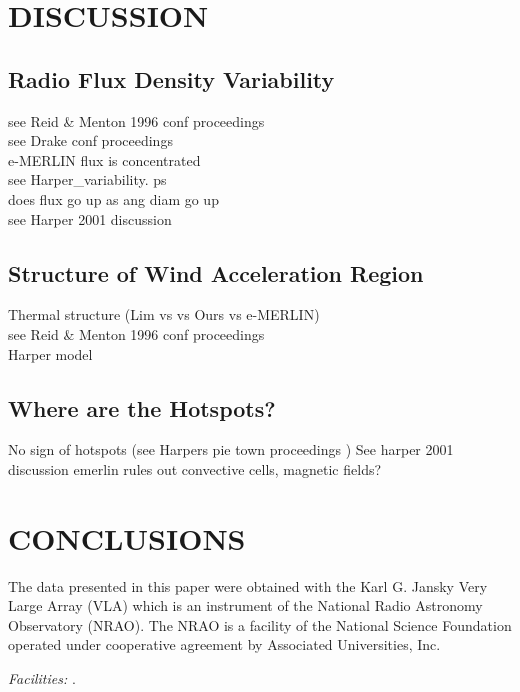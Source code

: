 \documentclass[iop]{emulateapj}
\begin{document}
\section{DISCUSSION}
\subsection{Radio Flux Density Variability} 
see Reid \& Menton 1996 conf proceedings\\
see Drake conf proceedings\\
e-MERLIN flux is concentrated\\
see Harper\_variability. ps\\
does flux go up as ang diam go up\\
see Harper 2001 discussion

\subsection{Structure of Wind Acceleration Region} 
Thermal structure (Lim vs vs Ours vs e-MERLIN)\\
see Reid \& Menton 1996 conf proceedings\\
Harper model

\subsection{Where are the Hotspots?}

No sign of hotspots (see Harpers pie town proceedings )
See harper 2001 discussion	
emerlin rules out convective cells, magnetic fields?





\section{CONCLUSIONS}
 


\acknowledgments
The data presented in this paper were obtained with the Karl G. Jansky Very Large Array (VLA) which is an instrument of the National Radio Astronomy Observatory (NRAO). The NRAO is a facility of the National Science Foundation operated under cooperative agreement by Associated Universities, Inc. 

{\it Facilities:} .




\end{document}
